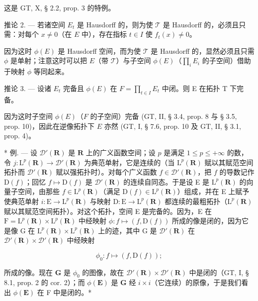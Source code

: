 这是 GT, X, § 2.2, prop. 3 的特例。

推论 2. --- 若诸空间 \(E_{t}\) 是 Hausdorff 的，则为使 \(\mathcal{T}\) 是 Hausdorff 的，必须且只需：对每个 \(x \neq 0\)（在 \(E\) 中），存在指标 \(t \in I\) 使 \(f_{t}(x) \neq 0\)。

因为这时 \(\phi(E)\) 是 Hausdorff 空间，而为使 \(\mathcal{T}\) 是 Hausdorff 的，显然必须且只需 \(\phi\) 是单射；注意这时可以把 \(E\)（带 \(\mathcal{T}\)）与子空间 \(\phi(E)\)（\(\prod_{i} E_{i}\) 的子空间）借助于映射 \(\phi\) 等同起来。

推论 3. --- 设诸 \(E_{t}\) 完备且 \(\phi(E)\) 在 \(F = \prod_{t \in I} E_{t}\) 中闭。则 E 在拓扑 T 下完备。

因为这时子空间 \(\phi(E)\)（\(F\) 的子空间）完备 (GT, II, § 3.4, prop. 8 与 § 3.5, prop. 10)，因此在逆像拓扑下 \(E\) 亦然 (GT, I, § 7.6, prop. 10 及 GT, II, § 3.1, prop. 4)。

* 例. --- 设 \(\mathcal{D}'(\mathbf{R})\) 是 \(\mathbf{R}\) 上的广义函数空间；设 \(p\) 是满足 \(1 \leqslant p \leqslant +\infty\) 的数，令 \(j: \mathrm{L}^p(\mathbf{R}) \to \mathcal{D}'(\mathbf{R})\) 为典范单射，它是连续的（当 \(\mathrm{L}^p(\mathbf{R})\) 赋以其赋范空间拓扑而 \(\mathcal{D}'(\mathbf{R})\) 赋以强拓扑时）。对每个广义函数 \(f \in \mathcal{D}'(\mathbf{R})\)，把 \(f\) 的导数记作 \(\mathrm{D}(f)\)；回忆 \(f \mapsto \mathrm{D}(f)\) 是 \(\mathcal{D}'(\mathbf{R})\) 的连续自同态。于是设 E 是 \(\mathrm{L}^p(\mathbf{R})\) 的向量子空间，由那些 \(f \in \mathrm{L}^p(\mathbf{R})\)（满足 \(\mathrm{D}(f) \in \mathrm{L}^p(\mathbf{R})\)）组成，并在 E 上赋予使典范单射 \(i: \mathrm{E} \to \mathrm{L}^p(\mathbf{R})\) 与映射 \(\mathrm{D}: \mathrm{E} \to \mathrm{L}^p(\mathbf{R})\) 都连续的最粗拓扑（\(\mathrm{L}^p(\mathbf{R})\) 赋以其赋范空间拓扑）。对这个拓扑，空间 E 是完备的。因为，E 在 \(\mathrm{F} = \mathrm{L}^p(\mathbf{R}) \times \mathrm{L}^p(\mathbf{R})\) 中经映射 \(\phi: f \mapsto (f, \mathrm{D}(f))\) 所成的像是闭的，因为它是像 G 在 \(\mathrm{L}^p(\mathbf{R}) \times \mathrm{L}^p(\mathbf{R})\) 上的迹，其中 G 是 \(\mathcal{D}'(\mathbf{R})\) 在 \(\mathcal{D}'(\mathbf{R}) \times \mathcal{D}'(\mathbf{R})\) 中经映射

\[
\phi_ {0}: f \mapsto (f, \mathrm{D} (f));
\]

所成的像。现在 \(\mathbf{G}\) 是 \(\phi_0\) 的图像，故在 \(\mathcal{D}'(\mathbf{R}) \times \mathcal{D}'(\mathbf{R})\) 中是闭的（GT, I, § 8.1, prop. 2 的 cor. 2）；而 \(\phi(\mathbf{E})\) 是 \(\mathbf{G}\) 经 \(i \times i\)（它连续）的原像，于是我们看出 \(\phi(\mathbf{E})\) 在 F 中是闭的。*

